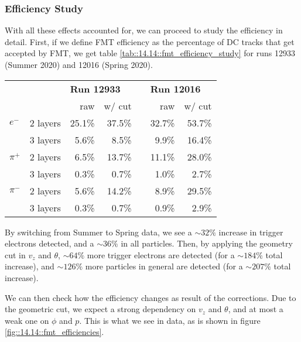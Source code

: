 \subsubsection{Efficiency Study}
\label{14.14::efficiency_study}
    With all these effects accounted for, we can proceed to study the efficiency in detail.
    First, if we define FMT efficiency as the percentage of DC tracks that get accepted by FMT, we get table \ref{tab::14.14::fmt_efficiency_study} for runs 12933 (Summer 2020) and 12016 (Spring 2020).

    \begin{center}
        \begin{tabularx}{0.70\textwidth}{Xr|rrcrr}
            & & \multicolumn{2}{l}{\textbf{Run 12933}}  & & \multicolumn{2}{l}{\textbf{Run 12016}} \\
                             &          & raw  & w/ cut   & & raw  & w/ cut   \\
            \hline
            \textbf{$e^-$}   & 2 layers & 25.1\% & 37.5\% & & 32.7\% & 53.7\% \\
                             & 3 layers &  5.6\% &  8.5\% & &  9.9\% & 16.4\% \\
            \hline
            \textbf{$\pi^+$} & 2 layers &  6.5\% & 13.7\% & & 11.1\% & 28.0\% \\
                             & 3 layers &  0.3\% &  0.7\% & &  1.0\% &  2.7\% \\
            \hline
            \textbf{$\pi^-$} & 2 layers &  5.6\% & 14.2\% & &  8.9\% & 29.5\% \\
                             & 3 layers &  0.3\% &  0.7\% & &  0.9\% &  2.9\%
        \end{tabularx}
        \label{tab::14.14::fmt_efficiency_study}
    \end{center}

    By switching from Summer to Spring data, we see a $\sim32\%$ increase in trigger electrons detected, and a $\sim36\%$ in all particles.
    Then, by applying the geometry cut in $v_z$ and $\theta$, $\sim64\%$ more trigger electrons are detected (for a $\sim184\%$ total increase), and $\sim126\%$ more particles in general are detected (for a $\sim207\%$ total increase).

    We can then check how the efficiency changes as result of the corrections.
    Due to the geometric cut, we expect a strong dependency on $v_z$ and $\theta$, and at most a weak one on $\phi$ and $p$.
    This is what we see in data, as is shown in figure \ref{fig::14.14::fmt_efficiencies}.

